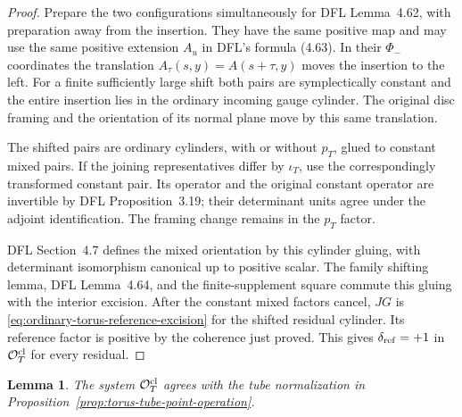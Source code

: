 \documentclass[11pt]{amsart}
\newtheorem{lemma}[theorem]{Lemma}
\theoremstyle{definition}
\theoremstyle{remark}
\theoremstyle{plain}
\begin{document}
\begin{proof}
Prepare the two configurations simultaneously
for DFL Lemma~4.62, with preparation away
from the insertion. They have the same
positive map and may use the same positive
extension $A_u$ in DFL's formula (4.63).
In their $\Phi_-$ coordinates the
translation $A_\tau(s,y)=A(s+\tau,y)$
moves the insertion to the left.
For a finite sufficiently large shift
both pairs are symplectically constant
and the entire insertion lies in the
ordinary incoming gauge cylinder.
The original disc framing and the
orientation of its normal plane move
by this same translation.

The shifted pairs are ordinary cylinders,
with or without $p_T$, glued to constant
mixed pairs. If the joining representatives
differ by $\iota_T$, use the correspondingly
transformed constant pair. Its operator
and the original constant operator are
invertible by DFL Proposition~3.19;
their determinant units agree under the
adjoint identification. The framing change
remains in the $p_T$ factor.

DFL Section~4.7 defines the mixed orientation
by this cylinder gluing, with determinant
isomorphism canonical up to positive scalar.
The family shifting lemma, DFL Lemma~4.64,
and the finite-supplement square commute
this gluing with the interior excision.
After the constant mixed factors cancel,
$JG$ is
\eqref{eq:ordinary-torus-reference-excision}
for the shifted residual cylinder.
Its reference factor is positive by the
coherence just proved. This gives
$\delta_{\rm ref}=+1$ in
$\mathcal O_T^{\rm cl}$ for every residual.
\end{proof}

\begin{lemma}\label{lem:torus-reference-tube-transport}
The system $\mathcal O_T^{\rm cl}$ agrees with
the tube normalization in
Proposition~\ref{prop:torus-tube-point-operation}.
\end{lemma}
\end{document}
